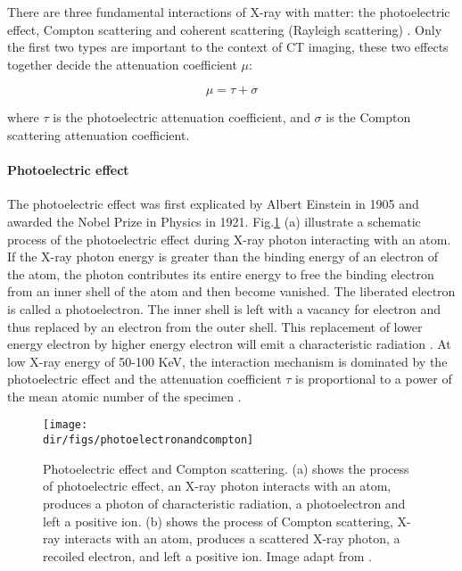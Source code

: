 There are three fundamental interactions of X-ray with matter: the photoelectric effect, Compton scattering and coherent scattering (Rayleigh scattering) \citep{hsieh2003computed}. Only the first two types are important to the context of CT imaging, these two effects together decide the attenuation coefficient $\mu$:

\begin{equation}
    \mu= \tau + \sigma
\end{equation}

where $\tau$ is the photoelectric attenuation coefficient, and $\sigma$ is the Compton scattering attenuation coefficient.

\paragraph{Photoelectric effect}
The photoelectric effect was first explicated by Albert Einstein in 1905 and awarded the Nobel Prize in Physics in 1921. Fig.\ref{photoelectricandcompton} (a) illustrate a schematic process of the photoelectric effect during X-ray photon interacting with an atom. If the X-ray photon energy is greater than the binding energy of an electron of the atom, the photon contributes its entire energy to free the binding electron from an inner shell of the atom and then become vanished. The liberated electron is called a photoelectron. The inner shell is left with a vacancy for electron and thus replaced by an electron from the outer shell. This replacement of lower energy electron by higher energy electron will emit a characteristic radiation \citep{hsieh2003computed}. At low X-ray energy of 50-100 KeV, the interaction mechanism is dominated by the photoelectric effect and the attenuation coefficient $\tau$ is proportional to a power of the mean atomic number of the specimen \citep{wildenschild2013x}.

\begin{figure}[htbp]
  \centering
  \texttt{[image: \\dir/figs/photoelectronandcompton]}
  \caption{Photoelectric effect and Compton scattering. (a) shows the process of photoelectric effect, an X-ray photon interacts with an atom, produces a photon of characteristic radiation, a photoelectron and left a positive ion. (b) shows the process of Compton scattering, X-ray interacts with an atom, produces a scattered X-ray photon, a recoiled electron, and left a positive ion. Image adapt from \citet{hsieh2003computed}.}
  \label{photoelectricandcompton}
\end{figure}

